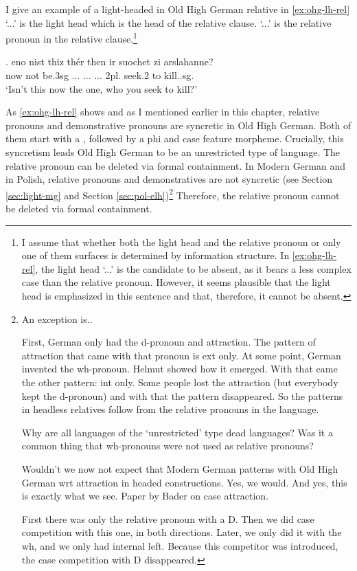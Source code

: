 I give an example of a light-headed in Old High German relative in \ref{ex:ohg-lh-rel}
 `...' is the light head which is the head of the relative clause.
 `...' is the relative pronoun in the relative clause.\footnote{
I assume that whether both the light head and the relative pronoun or only one of them surfaces is determined by information structure. In \ref{ex:ohg-lh-rel}, the light head  `...' is the candidate to be absent, as it bears a less complex case than the relative pronoun. However, it seems plausible that the light head is emphasized in this sentence and that, therefore, it cannot be absent.
}

\exg. eno nist thiz thér then ir suochet zi arslahanne?\\
 now {not be.3\ac{sg}} ... ...
 ... 2\ac{pl}. seek.2 to kill..\ac{sg}.\\
 `Isn't this now the one, who you seek to kill?'\label{ex:ohg-lh-rel}

As \ref{ex:ohg-lh-rel} shows and as I mentioned earlier in this chapter, relative pronouns and demonstrative pronouns are syncretic in Old High German. Both of them start with a , followed by a phi and case feature morpheme. Crucially, this syncretism leads Old High German to be an unrestricted type of language. The relative pronoun can be deleted via formal containment. In Modern German and in Polish, relative pronouns and demonstratives are not syncretic (see Section \ref{sec:light-mg} and Section \ref{sec:pol-elh})\footnote{
An exception is..

First, German only had the d-pronoun and attraction. The pattern of attraction that came with that pronoun is ext only.
At some point, German invented the wh-pronoun. Helmut showed how it emerged. With that came the other pattern: int only. Some people lost the attraction (but everybody kept the d-pronoun) and with that the pattern disappeared.
So the patterns in headless relatives follow from the relative pronouns in the language.

Why are all languages of the `unrestricted' type dead languages?
Was it a common thing that wh-pronouns were not used as relative pronouns?

Wouldn't we now not expect that Modern German patterns with Old High German wrt attraction in headed constructions. Yes, we would. And yes, this is exactly what we see. Paper by Bader on case attraction.

First there was only the relative pronoun with a D. Then we did case competition with this one, in both directions. Later, we only did it with the wh, and we only had internal left. Because this competitor was introduced, the case competition with D disappeared.
} Therefore, the relative pronoun cannot be deleted via formal containment.

